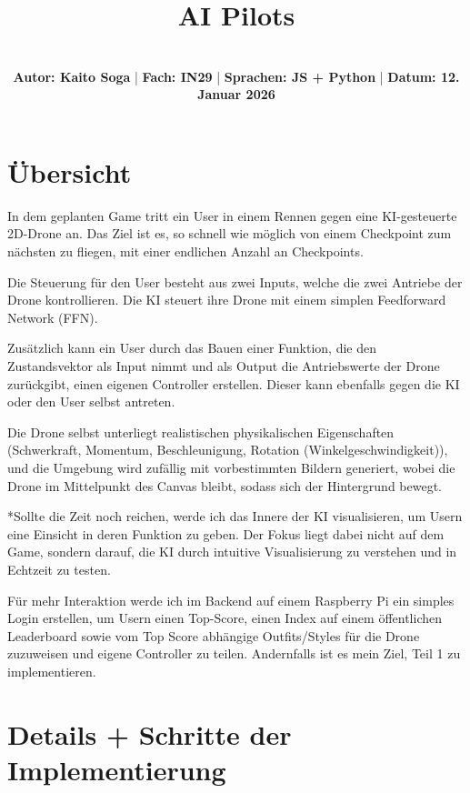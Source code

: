 \documentclass[8pt]{extarticle}
\title{\vspace{-4em}\textbf{AI Pilots}}
\author{\vspace{-2em}\textbf{}\\\textbf{Autor: Kaito Soga} | \textbf{Fach: IN29} | \textbf{Sprachen: JS + Python} | \textbf{Datum: 12. Januar 2026}}
\date{\vspace{-3em}}
\begin{document}
\maketitle

\section*{Übersicht}
\setlength{\parindent}{2em}
\setlength{\parskip}{1em}

\noindent
In dem geplanten Game tritt ein User in einem Rennen gegen eine KI-gesteuerte 2D-Drone an. Das Ziel ist es, so schnell wie möglich von einem Checkpoint zum nächsten zu fliegen, mit einer endlichen Anzahl an Checkpoints.

Die Steuerung für den User besteht aus zwei Inputs, welche die zwei Antriebe der Drone kontrollieren. Die KI steuert ihre Drone mit einem simplen Feedforward Network (FFN).

Zusätzlich kann ein User durch das Bauen einer Funktion, die den Zustandsvektor als Input nimmt und als Output die Antriebswerte der Drone zurückgibt, einen eigenen Controller erstellen. Dieser kann ebenfalls gegen die KI oder den User selbst antreten.

Die Drone selbst unterliegt realistischen physikalischen Eigenschaften (Schwerkraft, Momentum, Beschleunigung, Rotation (Winkelgeschwindigkeit)), und die Umgebung wird zufällig mit vorbestimmten Bildern generiert, wobei die Drone im Mittelpunkt des Canvas bleibt, sodass sich der Hintergrund bewegt.

*Sollte die Zeit noch reichen, werde ich das Innere der KI visualisieren, um Usern eine Einsicht in deren Funktion zu geben. Der Fokus liegt dabei nicht auf dem Game, sondern darauf, die KI durch intuitive Visualisierung zu verstehen und in Echtzeit zu testen.

Für mehr Interaktion werde ich im Backend auf einem Raspberry Pi ein simples Login erstellen, um Usern einen Top-Score, einen Index auf einem öffentlichen Leaderboard sowie vom Top Score abhängige Outfits/Styles für die Drone zuzuweisen und eigene Controller zu teilen. Andernfalls ist es mein Ziel, Teil 1 zu implementieren.

\section*{Details + Schritte der Implementierung}

\section{}
\end{document}
